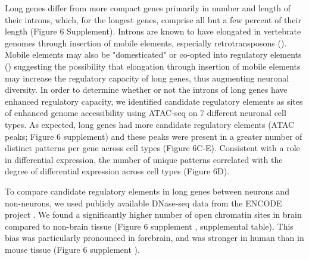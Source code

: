 Long genes differ from more compact genes primarily in number and length of their introns, which, for the longest genes, comprise all but a few percent of their length (Figure 6 Supplement). Introns are known to have elongated in vertebrate genomes through insertion of mobile elements, especially retrotransposons (). Mobile elements may also be "domesticated" or co-opted into regulatory elements () suggesting the possibility that elongation through insertion of mobile elements may increase the regulatory capacity of long genes, thus augmenting neuronal diversity. In order to determine whether or not the introns of long genes have enhanced regulatory capacity, we identified candidate regulatory elements as sites of enhanced genome accessibility using ATAC-seq \cite{Buenrostro_2013} on 7 different neuronal cell types. As expected, long genes had more candidate regulatory elements (ATAC peaks; Figure 6 supplement) and these peaks were present in a greater number of distinct patterns per gene across cell types (Figure 6C-E). Consistent with a role in differential expression, the number of unique patterns correlated with the degree of differential expression across cell types (Figure 6D).

To compare candidate regulatory elements in long genes between neurons and non-neurons, we used publicly available DNase-seq data from the ENCODE project \cite{Dunham_2012}. We found a significantly higher number of open chromatin sites in brain compared to non-brain tissue (Figure 6 supplement , supplemental table). This bias was  particularly pronounced in forebrain, and was stronger in human than in mouse tissue (Figure 6 supplement ).
